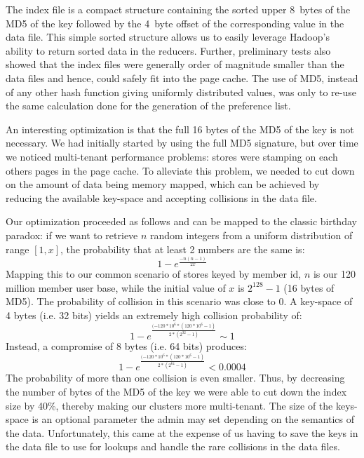 The index file is a compact structure containing the sorted upper
8~bytes of the MD5 of the key followed by the 4~byte offset of the
corresponding value in the data file. This simple sorted structure
allows us to easily leverage Hadoop's ability to return sorted data
in the reducers. Further, preliminary tests also showed that the
index files were generally order of magnitude smaller than the data
files and hence, could safely fit into the page cache. The use of
MD5, instead of any other hash function giving uniformly distributed
values, was only to re-use the same calculation done for the generation
of the preference list. 

An interesting optimization is that the full 16 bytes of the MD5 of
the key is not necessary. We had initially started by using the full
MD5 signature, but over time we noticed multi-tenant performance
problems: stores were stamping on each others pages in the page cache.
To alleviate this problem, we needed to cut down on the amount of data
being memory mapped, which can be achieved by reducing the available
key-space and accepting collisions in the data file. 

Our optimization proceeded as follows and can be mapped to the classic
birthday paradox: if we want to retrieve $n$ random integers from a
uniform distribution of range $[1, x]$, the probability that at least
2 numbers are the same is:
\begin{equation}
1 - e^{\frac{-n(n-1)}{2x}}
\end{equation}
Mapping this to our common scenario of stores keyed by member id, $n$ 
is our 120 million member user base, while the initial value of 
$x$ is $2^{128} - 1$ (16 bytes of MD5). The probability of collision 
in this scenario was close to 0. A key-space of 4 bytes (i.e. 32 bits) 
yields an extremely high collision probability of:
\begin{equation}
1 - e^{\frac{(-120*10^{6} * (120*10^{6} - 1)}{2 * (2^{32} - 1)}} \sim 1
\end{equation}
Instead, a compromise of 8 bytes (i.e. 64 bits) produces:
\begin{equation} 
1 - e^{\frac{(-120*10^{6} * (120*10^{6} - 1)} { 2 * (2^{64} - 1 )}} < 0.0004
\end{equation}
The probability of more than one collision is even smaller. Thus, by
decreasing the number of bytes of the MD5 of the key we were able to
cut down the index size by 40\%, thereby making our clusters more
multi-tenant. The size of the keys-space is an optional parameter the
admin may set depending on the semantics of the data. Unfortunately,
this came at the expense of us having to save the keys in the data
file to use for lookups and handle the rare collisions in the data
files.

